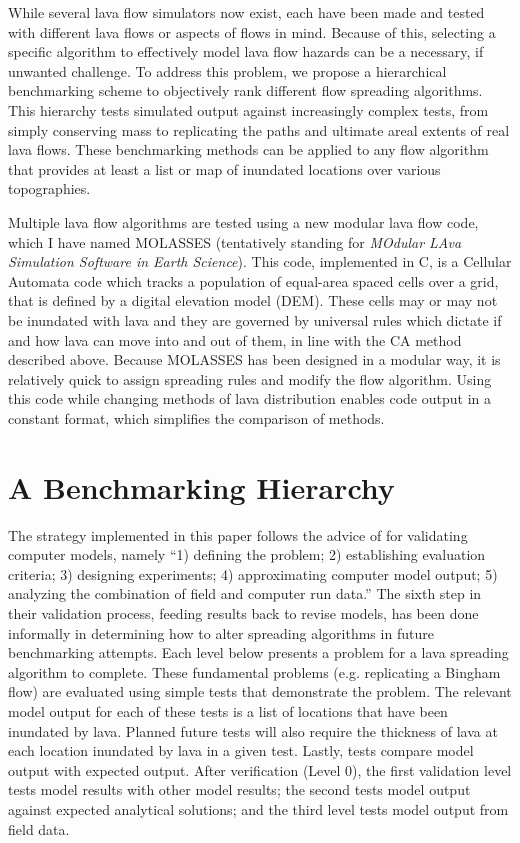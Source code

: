 \documentclass[12pt,letter]{article}
\begin{document}
	While several lava flow simulators now exist, each have been made and tested with different lava flows or aspects of flows in mind. Because of this, selecting a specific algorithm to effectively model lava flow hazards can be a necessary, if unwanted challenge. To address this problem, we propose a hierarchical benchmarking scheme to objectively rank different flow spreading algorithms. This hierarchy tests simulated output against increasingly complex tests, from simply conserving mass to replicating the paths and ultimate areal extents of real lava flows. These benchmarking methods can be applied to any flow algorithm that provides at least a list or map of inundated locations over various topographies.

	Multiple lava flow algorithms are tested using a new modular lava flow code, which I have named MOLASSES (tentatively standing for \textit{MOdular LAva Simulation Software in Earth Science}). This code, implemented in C, is a Cellular Automata code which tracks a population of equal-area spaced cells over a grid, that is defined by a digital elevation model (DEM). These cells may or may not be inundated with lava and they are governed by universal rules which dictate if and how lava can move into and out of them, in line with the CA method described above. Because MOLASSES has been designed in a modular way, it is relatively quick to assign spreading rules and modify the flow algorithm. Using this code while changing methods of lava distribution enables code output in a constant format, which simplifies the comparison of methods.


	\section{A Benchmarking Hierarchy}
	
	The strategy implemented in this paper follows the advice of \citet{bayarri2007framework} for validating computer models, namely ``1) defining the problem; 2) establishing evaluation criteria; 3) designing experiments; 4) approximating computer model output; 5) analyzing the combination of field and computer run data.'' The sixth step in their validation process, feeding results back to revise models, has been done informally in determining how to alter spreading algorithms in future benchmarking attempts. Each level below presents a problem for a lava spreading algorithm to complete. These fundamental problems (e.g. replicating a Bingham flow) are evaluated using simple tests that demonstrate the problem. The relevant model output for each of these tests is a list of locations that have been inundated by lava. Planned future tests will also require the thickness of lava at each location inundated by lava in a given test. Lastly, tests compare model output with expected output. After verification (Level 0), the first validation level tests model results with other model results; the second tests model output against expected analytical solutions; and the third level tests model output from field data.
\end{document}
